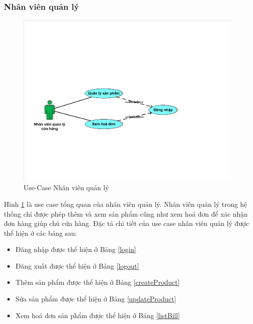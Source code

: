 \subsubsection{Nhân viên quản lý}
\begin{center}
    \begin{figure}[h]
    \begin{center}
     \includegraphics[scale=0.7]{image/UseCaseTongQuanNV.pdf}
    \end{center}
    \caption{Use-Case Nhân viên quản lý}
    \label{refhinh3_4}
    \end{figure}
\end{center}
Hình \ref{refhinh3_4} là use case tổng quan của nhân viên quản lý. Nhân viên quản lý trong hệ thống chỉ được phép thêm và xem sản phẩm cũng như xem hoá đơn để xác nhận đơn hàng giúp chủ cửa hàng. Đặc tả chi tiết của use case nhân viên quản lý được thể hiện ở các bảng sau:
\begin{itemize}
\item Đăng nhập được thể hiện ở Bảng \ref{login}
\item Đăng xuất được thể hiện ở Bảng \ref{logout}
\item Thêm sản phẩm được thể hiện ở Bảng \ref{createProduct}
\item Sửa sản phẩm được thể hiện ở Bảng \ref{updateProduct}
\item Xem hoá đơn sản phẩm được thể hiện ở Bảng \ref{listBill}
\end{itemize}
